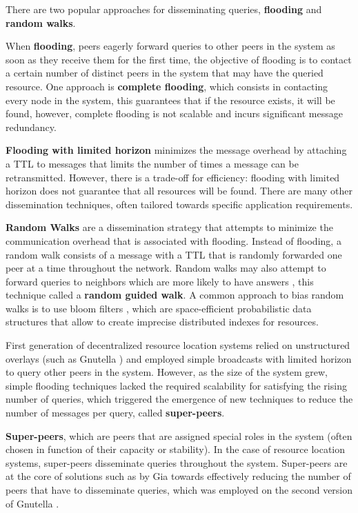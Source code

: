 There are two popular approaches for disseminating queries, \textbf{flooding} and \textbf{random walks}.

When \textbf{flooding}, peers eagerly forward queries to other peers in the system as soon as they receive them for the first time, the objective of flooding is to contact a certain number of distinct peers in the system that may have the queried resource. One approach is \textbf{complete flooding}, which consists in contacting every node in the system, this guarantees that if the resource exists, it will be found, however, complete flooding is not scalable and incurs significant message redundancy. 

\textbf{Flooding with limited horizon} minimizes the message overhead by attaching a TTL to messages that limits the number of times a message can be retransmitted. However, there is a trade-off for efficiency: flooding with limited horizon does not guarantee that all resources will be found. There are many other dissemination techniques, often tailored towards specific application requirements. 

\textbf{Random Walks} are a dissemination strategy that attempts to minimize the communication overhead that is associated with flooding. Instead of flooding, a random walk consists of a message with a TTL that is randomly forwarded one peer at a time throughout the network. Random walks may also attempt to forward queries to neighbors which are more likely to have answers \cite{1022239}, this technique called a \textbf{random guided walk}. A common approach to bias random walks is to use bloom filters \cite{5751342}, which are space-efficient probabilistic data structures that allow to  create imprecise distributed indexes for resources.

First generation of decentralized resource location systems relied on unstructured overlays (such as Gnutella \cite{gnutella_gtk}) and employed simple broadcasts with limited horizon to query other peers in the system. However, as the size of the system grew, simple flooding techniques lacked the required scalability for satisfying the rising number of queries, which triggered the emergence of new techniques to reduce the number of messages per query, called \textbf{super-peers}. 

\textbf{Super-peers}, which are peers that are assigned special roles in the system (often chosen in function of their capacity or stability). In the case of resource location systems, super-peers disseminate queries throughout the system. Super-peers are at the core of solutions such as by Gia \cite{Chawathe2003} towards effectively reducing the number of peers that have to disseminate queries, which was employed on the second version of Gnutella \cite{gnutella_gtk}. 

